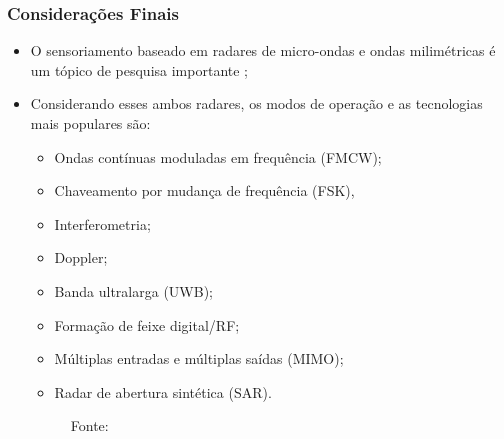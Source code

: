 \documentclass[xcolor=dvipsnames, aspectratio=169]{beamer}
\begin{document}
\begin{frame}
\frametitle{Considerações Finais}
	\begin{itemize}
		\item O sensoriamento baseado em radares de micro-ondas e ondas milimétricas é um tópico de pesquisa importante \cite{cardillo_2023};
        \item Considerando esses ambos radares, os modos de operação e as tecnologias mais populares são:
        \begin{itemize}
            \item Ondas contínuas moduladas em frequência (FMCW); 
            \item Chaveamento por mudança de frequência (FSK), 
            \item Interferometria; 
            \item Doppler;
            \item Banda ultralarga (UWB); 
            \item Formação de feixe digital/RF;
            \item Múltiplas entradas e múltiplas saídas (MIMO);
            \item Radar de abertura sintética (SAR).
        \end{itemize}

        \begin{figure}
            \centering
            {Fonte: \cite{cardillo_2023}}
            \label{fig:tc_microwave}
        \end{figure}

	\end{itemize}
\end{frame}


\begin{frame}
    \printbibliography
\end{frame}


\begin{frame}
\titlepage %
\end{frame}
\end{document}
